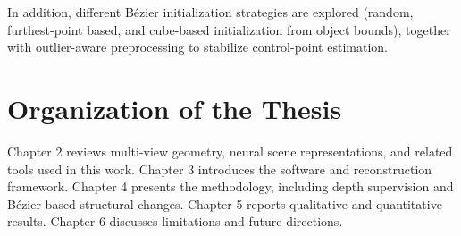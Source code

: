 In addition, different B\'ezier initialization strategies are explored (random, furthest-point based, and cube-based initialization from object bounds), together with outlier-aware preprocessing to stabilize control-point estimation.

\section{Organization of the Thesis}
Chapter 2 reviews multi-view geometry, neural scene representations, and related tools used in this work. Chapter 3 introduces the software and reconstruction framework. Chapter 4 presents the methodology, including depth supervision and B\'ezier-based structural changes. Chapter 5 reports qualitative and quantitative results. Chapter 6 discusses limitations and future directions.


